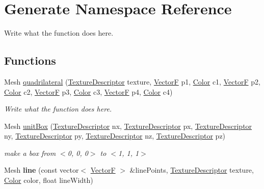 \hypertarget{namespaceGenerate}{\section{Generate Namespace Reference}
\label{namespaceGenerate}
}


Write what the function does here.  


\subsection*{Functions}
\begin{DoxyCompactItemize}
\item 
Mesh \hyperlink{namespaceGenerate_afd427e6ee5edcf5cab7d521048466496}{quadrilateral} (\hyperlink{structTextureDescriptor}{Texture\+Descriptor} texture, \hyperlink{structVectorF}{Vector\+F} p1, \hyperlink{structColor}{Color} c1, \hyperlink{structVectorF}{Vector\+F} p2, \hyperlink{structColor}{Color} c2, \hyperlink{structVectorF}{Vector\+F} p3, \hyperlink{structColor}{Color} c3, \hyperlink{structVectorF}{Vector\+F} p4, \hyperlink{structColor}{Color} c4)
\begin{DoxyCompactList}\small\item\em Write what the function does here. \end{DoxyCompactList}\item 
Mesh \hyperlink{namespaceGenerate_a6b71bfa779ab0216bd94409816731e14}{unit\+Box} (\hyperlink{structTextureDescriptor}{Texture\+Descriptor} nx, \hyperlink{structTextureDescriptor}{Texture\+Descriptor} px, \hyperlink{structTextureDescriptor}{Texture\+Descriptor} ny, \hyperlink{structTextureDescriptor}{Texture\+Descriptor} py, \hyperlink{structTextureDescriptor}{Texture\+Descriptor} nz, \hyperlink{structTextureDescriptor}{Texture\+Descriptor} pz)
\begin{DoxyCompactList}\small\item\em make a box from $<$0, 0, 0$>$ to $<$1, 1, 1$>$ \end{DoxyCompactList}\item 
\hypertarget{namespaceGenerate_a5056281a720da9d629addda412e12a71}{Mesh {\bfseries line} (const vector$<$ \hyperlink{structVectorF}{Vector\+F} $>$ \&line\+Points, \hyperlink{structTextureDescriptor}{Texture\+Descriptor} texture, \hyperlink{structColor}{Color} color, float line\+Width)}\label{namespaceGenerate_a5056281a720da9d629addda412e12a71}

\end{DoxyCompactItemize}


